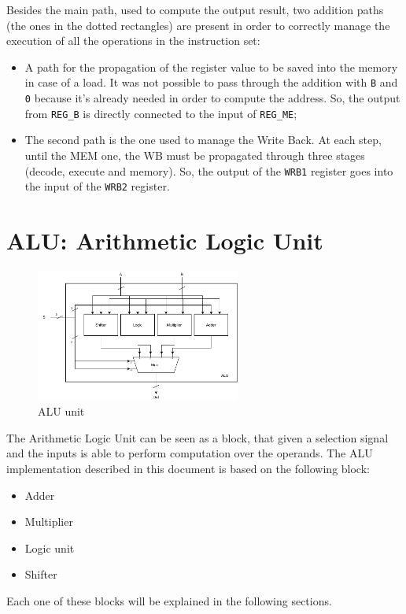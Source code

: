 Besides the main path, used to compute the output result, two addition paths (the ones in the dotted rectangles) are present in order to correctly manage the execution of all the operations in the instruction set:
\begin{itemize}
    \item A path for the propagation of the register value to be saved into the memory in case of a load. It was not possible to pass through the addition with \texttt{B} and \texttt{0} because it's already needed in order to compute the address. So, the output from \texttt{REG\_B} is directly connected to the input of \texttt{REG\_ME};
    \item The second path is the one used to manage the Write Back. At each step, until the MEM one, the WB must be propagated through three stages (decode, execute and memory). So, the output of the \texttt{WRB1} register goes into the input of the \texttt{WRB2} register.
\end{itemize}

\section{ALU: Arithmetic Logic Unit}
\begin{figure}[h]
    \centering
    \includegraphics[width=0.6\textwidth]{chapters/5_ExecuteStage/images/ALU.pdf}
    \caption{ALU unit}
    \label{fig:ALU} 
\end{figure}
The Arithmetic Logic Unit can be seen as a block, that given a selection signal and the inputs is able to perform computation over the operands. The ALU implementation described in this document is based on the following block:
\begin{itemize}
    \itemsep0sp
    \item Adder
    \item Multiplier
    \item Logic unit
    \item Shifter
\end{itemize}
Each one of these blocks will be explained in the following sections.


